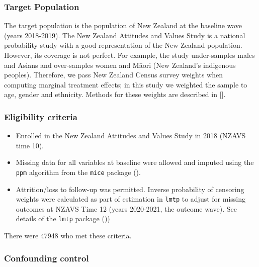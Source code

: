 \documentclass[
  singlecolumn]{article}
\providecommand{\tightlist}{%
  \setlength{\itemsep}{0pt}\setlength{\parskip}{0pt}}\usepackage{longtable,booktabs,array}
\begin{document}
\subsubsection{Target Population}\label{target-population}

The target population is the population of New Zealand at the baseline
wave (years 2018-2019). The New Zealand Attitudes and Values Study is a
national probability study with a good representation of the New Zealand
population. However, its coverage is not perfect. For example, the study
under-samples males and Asians and over-samples women and Māori (New
Zealand's indigenous peoples). Therefore, we pass New Zealand Census
survey weights when computing marginal treatment effects; in this study
we weighted the sample to age, gender and ethnicity. Methods for these
weights are described in {[}{]}.

\subsubsection{Eligibility criteria}\label{eligibility-criteria}

\begin{itemize}
\tightlist
\item
  Enrolled in the New Zealand Attitudes and Values Study in 2018 (NZAVS
  time 10).
\item
  Missing data for all variables at baseline were allowed and imputed
  using the \texttt{ppm} algorithm from the \texttt{mice} package
  ().
\item
  Attrition/loss to follow-up was permitted. Inverse probability of
  censoring weights were calculated as part of estimation in
  \texttt{lmtp} to adjust for missing outcomes at NZAVS Time 12 (years
  2020-2021, the outcome wave). See details of the \texttt{lmtp} package
  ())
\end{itemize}

There were 47948 who met these criteria.

\subsubsection{Confounding control}\label{confounding-control}
\end{document}
